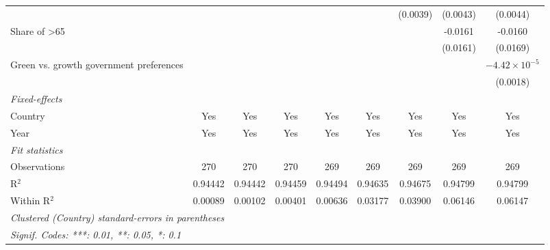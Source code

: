 \begin{table}[htbp]
\begin{tabular}{lcccccccc}
                                                    &          &          &          &          &          & (0.0039) & (0.0043) & (0.0044)\\   
      Share of >65                                  &          &          &          &          &          &          & -0.0161  & -0.0160\\   
                                                    &          &          &          &          &          &          & (0.0161) & (0.0169)\\   
      Green vs. growth government preferences       &          &          &          &          &          &          &          & $-4.42\times 10^{-5}$\\    
                                                    &          &          &          &          &          &          &          & (0.0018)\\   
      \midrule
      \emph{Fixed-effects}\\
      Country                                       & Yes      & Yes      & Yes      & Yes      & Yes      & Yes      & Yes      & Yes\\  
      Year                                          & Yes      & Yes      & Yes      & Yes      & Yes      & Yes      & Yes      & Yes\\  
      \midrule
      \emph{Fit statistics}\\
      Observations                                  & 270      & 270      & 270      & 269      & 269      & 269      & 269      & 269\\  
      R$^2$                                         & 0.94442  & 0.94442  & 0.94459  & 0.94494  & 0.94635  & 0.94675  & 0.94799  & 0.94799\\  
      Within R$^2$                                  & 0.00089  & 0.00102  & 0.00401  & 0.00636  & 0.03177  & 0.03900  & 0.06146  & 0.06147\\  
      \midrule \midrule
      \multicolumn{9}{l}{\emph{Clustered (Country) standard-errors in parentheses}}\\
      \multicolumn{9}{l}{\emph{Signif. Codes: ***: 0.01, **: 0.05, *: 0.1}}\\
   \end{tabular}
\end{table}



